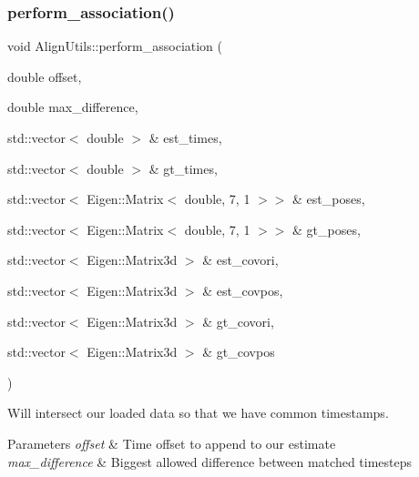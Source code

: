 \subsubsection{\texorpdfstring{perform\+\_\+association()}{perform\_association()}\hspace{0.1cm}{\footnotesize\ttfamily [2/2]}}
{\footnotesize\ttfamily void Align\+Utils\+::perform\+\_\+association (\begin{DoxyParamCaption}\item[{double}]{offset,  }\item[{double}]{max\+\_\+difference,  }\item[{std\+::vector$<$ double $>$ \&}]{est\+\_\+times,  }\item[{std\+::vector$<$ double $>$ \&}]{gt\+\_\+times,  }\item[{std\+::vector$<$ Eigen\+::\+Matrix$<$ double, 7, 1 $>$$>$ \&}]{est\+\_\+poses,  }\item[{std\+::vector$<$ Eigen\+::\+Matrix$<$ double, 7, 1 $>$$>$ \&}]{gt\+\_\+poses,  }\item[{std\+::vector$<$ Eigen\+::\+Matrix3d $>$ \&}]{est\+\_\+covori,  }\item[{std\+::vector$<$ Eigen\+::\+Matrix3d $>$ \&}]{est\+\_\+covpos,  }\item[{std\+::vector$<$ Eigen\+::\+Matrix3d $>$ \&}]{gt\+\_\+covori,  }\item[{std\+::vector$<$ Eigen\+::\+Matrix3d $>$ \&}]{gt\+\_\+covpos }\end{DoxyParamCaption})\hspace{0.3cm}{\ttfamily [static]}}



Will intersect our loaded data so that we have common timestamps. 


\begin{DoxyParams}{Parameters}
{\em offset} & Time offset to append to our estimate \\
\hline
{\em max\+\_\+difference} & Biggest allowed difference between matched timesteps \\
\hline
\end{DoxyParams}
